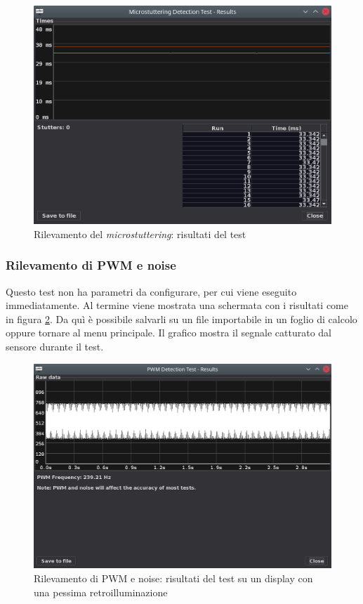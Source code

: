 \begin{figure}[H]
	\centering
	\includegraphics[width=\textwidth]{Applicazione_files/gui_microstuttering_results.png}
	\caption{Rilevamento del \textit{microstuttering}: risultati del test}
	\label{fig:gui_microstuttering_results}
\end{figure}

\subsubsection{Rilevamento di PWM e noise}
Questo test non ha parametri da configurare, per cui viene eseguito immediatamente. Al termine viene mostrata una schermata con i risultati come in figura \ref{fig:gui_pwm_results}. Da quì è possibile salvarli su un file importabile in un foglio di calcolo oppure tornare al menu principale. Il grafico mostra il segnale catturato dal sensore durante il test.

\begin{figure}[H]
	\centering
	\includegraphics[width=\textwidth]{Applicazione_files/gui_pwm_results.png}
	\caption{Rilevamento di PWM e noise: risultati del test su un display con una pessima retroilluminazione}
	\label{fig:gui_pwm_results}
\end{figure}

